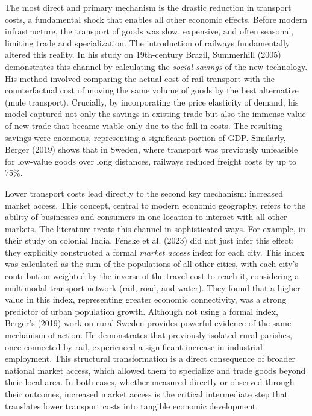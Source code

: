 \documentclass[12pt, a4paper]{article}
\begin{document}
The most direct and primary mechanism is the drastic reduction in transport costs, a fundamental shock that enables all other economic effects. Before modern infrastructure, the transport of goods was slow, expensive, and often seasonal, limiting trade and specialization. The introduction of railways fundamentally altered this reality. In his study on 19th-century Brazil, Summerhill (2005) demonstrates this channel by calculating the \textit{social savings} of the new technology. His method involved comparing the actual cost of rail transport with the counterfactual cost of moving the same volume of goods by the best alternative (mule transport). Crucially, by incorporating the price elasticity of demand, his model captured not only the savings in existing trade but also the immense value of new trade that became viable only due to the fall in costs. The resulting savings were enormous, representing a significant portion of GDP. Similarly, Berger (2019) shows that in Sweden, where transport was previously unfeasible for low-value goods over long distances, railways reduced freight costs by up to 75\%.

Lower transport costs lead directly to the second key mechanism: increased market access. This concept, central to modern economic geography, refers to the ability of businesses and consumers in one location to interact with all other markets. The literature treats this channel in sophisticated ways. For example, in their study on colonial India, Fenske et al. (2023) did not just infer this effect; they explicitly constructed a formal \textit{market access} index for each city. This index was calculated as the sum of the populations of all other cities, with each city's contribution weighted by the inverse of the travel cost to reach it, considering a multimodal transport network (rail, road, and water). They found that a higher value in this index, representing greater economic connectivity, was a strong predictor of urban population growth. Although not using a formal index, Berger's (2019) work on rural Sweden provides powerful evidence of the same mechanism of action. He demonstrates that previously isolated rural parishes, once connected by rail, experienced a significant increase in industrial employment. This structural transformation is a direct consequence of broader national market access, which allowed them to specialize and trade goods beyond their local area. In both cases, whether measured directly or observed through their outcomes, increased market access is the critical intermediate step that translates lower transport costs into tangible economic development.
\end{document}
